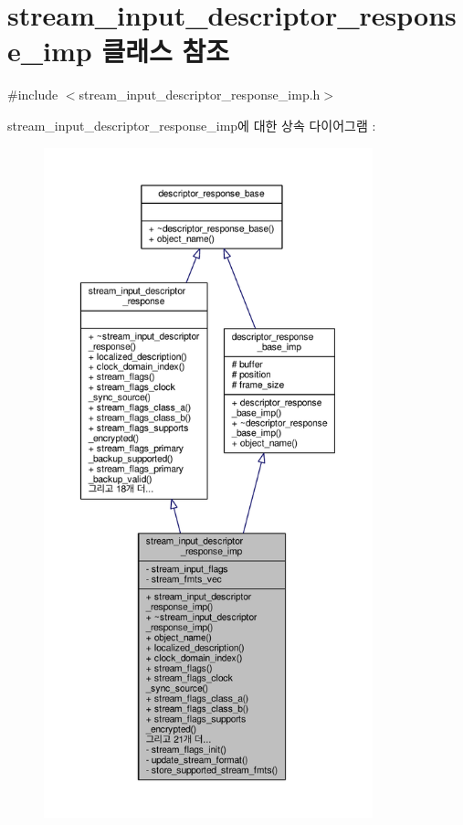 \hypertarget{classavdecc__lib_1_1stream__input__descriptor__response__imp}{}\section{stream\+\_\+input\+\_\+descriptor\+\_\+response\+\_\+imp 클래스 참조}
\label{classavdecc__lib_1_1stream__input__descriptor__response__imp}


{\ttfamily \#include $<$stream\+\_\+input\+\_\+descriptor\+\_\+response\+\_\+imp.\+h$>$}



stream\+\_\+input\+\_\+descriptor\+\_\+response\+\_\+imp에 대한 상속 다이어그램 \+: 
\nopagebreak
\begin{figure}[H]
\begin{center}
\leavevmode
\includegraphics[height=550pt]{classavdecc__lib_1_1stream__input__descriptor__response__imp__inherit__graph}
\end{center}
\end{figure}


